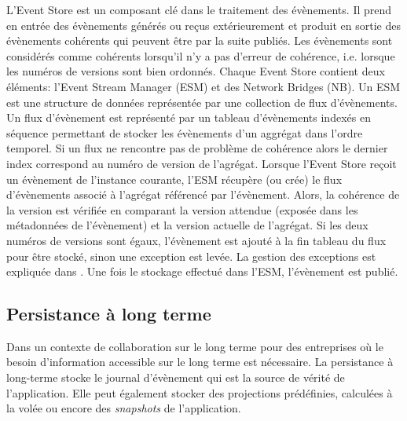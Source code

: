 L'Event Store est un composant clé dans le traitement des évènements. Il prend 
en entrée des évènements générés ou reçus extérieurement et produit en sortie 
des évènements cohérents qui peuvent être par la suite publiés. Les évènements 
sont considérés comme cohérents lorsqu'il n'y a pas d'erreur de cohérence, i.e. 
lorsque les numéros de versions sont bien ordonnés. Chaque Event Store contient 
deux éléments: l'Event Stream Manager (ESM) et des Network Bridges (NB). Un
ESM est une structure de données représentée par une collection de flux 
d'évènements. Un flux d'évènement est représenté par un tableau d'évènements 
indexés en séquence permettant de stocker les évènements d'un aggrégat dans 
l'ordre temporel. Si un flux ne rencontre pas de problème de cohérence alors le 
dernier index correspond au numéro de version de l'agrégat. Lorsque l'Event Store 
reçoit un évènement de l'instance courante, l'ESM récupère (ou crée) le flux d'évènements associé à l'agrégat 
référencé par l'évènement. Alors, la cohérence de la version est vérifiée en 
comparant la version attendue (exposée dans les métadonnées de l'évènement) 
et la version actuelle de l'agrégat. Si les deux numéros de versions sont égaux, 
l'évènement est ajouté à la fin tableau du flux pour être stocké, sinon une 
exception est levée. La gestion des exceptions est expliquée dans . Une fois le stockage effectué dans l'ESM, l'évènement est publié.



\subsection{Persistance à long terme}\label{sec:persistance-a-long-terme}
Dans un contexte de collaboration sur le long terme pour des entreprises où le 
besoin d'information accessible sur le long terme est nécessaire. La persistance à 
long-terme stocke le journal d'évènement qui est la 
source de vérité de l'application. Elle peut également stocker des projections 
prédéfinies, calculées à la volée ou encore des \textit{snapshots} de l'application.

